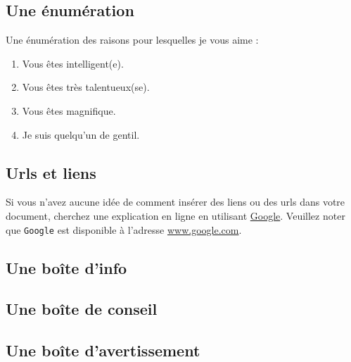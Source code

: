 \documentclass{42-fr}
\begin{document}
        \subsection{Une \'enum\'eration}

            Une \'enum\'eration des raisons pour lesquelles je vous
            aime :\\

            \begin{enumerate}\itemsep7pt
                \item Vous \^etes intelligent(e).
                \item Vous \^etes tr\`es talentueux(se).
                \item Vous \^etes magnifique.
                \item Je suis quelqu'un de gentil.
            \end{enumerate}


        \subsection{Urls et liens}

            Si vous n'avez aucune id\'ee de comment ins\'erer des
            liens ou des urls dans votre document, cherchez une
            explication en ligne en utilisant
            \href{www.google.com}{Google}. Veuillez noter que
            \texttt{Google} est disponible \`a l'adresse
            \url{www.google.com}.


        \newpage


        \subsection{Une bo\^ite d'info}



        \subsection{Une bo\^ite de conseil}



        \subsection{Une bo\^ite d'avertissement}
\end{document}
